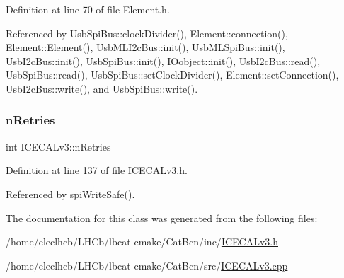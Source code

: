 Definition at line 70 of file Element.\+h.



Referenced by Usb\+Spi\+Bus\+::clock\+Divider(), Element\+::connection(), Element\+::\+Element(), Usb\+M\+L\+I2c\+Bus\+::init(), Usb\+M\+L\+Spi\+Bus\+::init(), Usb\+I2c\+Bus\+::init(), Usb\+Spi\+Bus\+::init(), I\+Oobject\+::init(), Usb\+I2c\+Bus\+::read(), Usb\+Spi\+Bus\+::read(), Usb\+Spi\+Bus\+::set\+Clock\+Divider(), Element\+::set\+Connection(), Usb\+I2c\+Bus\+::write(), and Usb\+Spi\+Bus\+::write().

\mbox{\label{classICECALv3_ae877ce34b3a4d6c368cc6409ac9614fa}} 
\subsubsection{\texorpdfstring{n\+Retries}{nRetries}}
{\footnotesize\ttfamily int I\+C\+E\+C\+A\+Lv3\+::n\+Retries\hspace{0.3cm}{\ttfamily [private]}}



Definition at line 137 of file I\+C\+E\+C\+A\+Lv3.\+h.



Referenced by spi\+Write\+Safe().



The documentation for this class was generated from the following files\+:\begin{DoxyCompactItemize}
\item 
/home/eleclhcb/\+L\+H\+Cb/lbcat-\/cmake/\+Cat\+Bcn/inc/\hyperlink{ICECALv3_8h}{I\+C\+E\+C\+A\+Lv3.\+h}\item 
/home/eleclhcb/\+L\+H\+Cb/lbcat-\/cmake/\+Cat\+Bcn/src/\hyperlink{ICECALv3_8cpp}{I\+C\+E\+C\+A\+Lv3.\+cpp}\end{DoxyCompactItemize}
